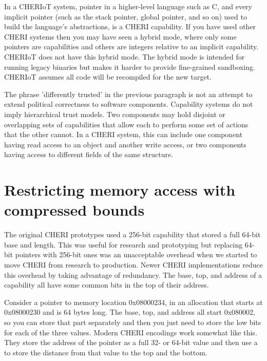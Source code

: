 \begin{note}
	In a CHERIoT system,  pointer in a higher-level language such as C, and every implicit pointer (such as the stack pointer, global pointer, and so on) used to build the language's abstractions, is a CHERI capability.
	If you have used other CHERI systems then you may have seen a hybrid mode, where only some pointers are capabilities and others are integers relative to an implicit capability.
	CHERIoT does not have this hybrid mode.
	The hybrid mode is intended for running legacy binaries but makes it harder to provide fine-grained sandboxing.
	CHERIoT assumes all code will be recompiled for the new target.
\end{note}

The phrase 'differently trusted' in the previous paragraph is not an attempt to extend political correctness to software components.
Capability systems do not imply hierarchical trust models.
Two components may hold disjoint or overlapping sets of capabilities that allow each to perform some set of actions that the other cannot.
In a CHERI system, this can include one component having read access to an object and another write access, or two components having access to different fields of the same structure.

\section{Restricting memory access with compressed bounds}

The original CHERI prototypes used a 256-bit capability that stored a full 64-bit base and length.
This was useful for research and prototyping but replacing 64-bit pointers with 256-bit ones was an unacceptable overhead when we started to move CHERI from research to production.
Newer CHERI implementations reduce this overhead by taking advantage of redundancy.
The base, top, and address of a capability all have some common bits in the top of their address.


Consider a pointer to memory location 0x08000234, in an allocation that starts at 0x08000230 and is 64 bytes long.
The base, top, and address all start 0x080002, so you can store that part separately and then you just need to store the low bits for each of the three values.
Modern CHERI encodings work somewhat like this.
They store the address of the pointer as a full 32- or 64-bit value and then use a  to store the distance from that value to the top and the bottom.

